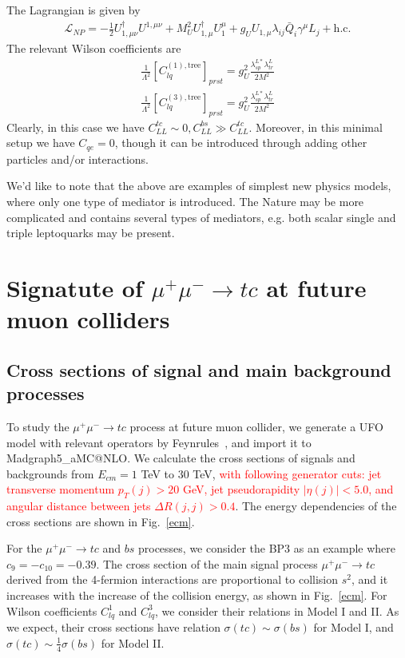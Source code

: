 \documentclass[a4paper,11pt]{article}
\makeatletter
\newcommand{\mgamc}{Madgraph5\_aMC@NLO}
\makeatother
\begin{document}
\begin{enumerate}
        The Lagrangian is given by 
        \begin{align}
        \mathcal{L}_{NP}=-\frac{1}{2}U_{1,\mu\nu}^{\dag}U^{1,\mu\nu}+M_U^2U_{1,\mu}^{\dag}U_1^{\mu}+g_UU_{1,\mu}\lambda_{ij}\bar{Q}_{i}\gamma^{\mu}L_{j}+\textrm{h.c.}
        \end{align}
        The relevant Wilson coefficients are
        \begin{align}
            \frac{1}{\Lambda^2}[C_{lq}^{(1),\textrm{tree}}]_{prst}=g_U^2\frac{\lambda_{sp}^{L*}\lambda_{tr}^{L}}{2M^2}\\
            \frac{1}{\Lambda^2}[C_{lq}^{(3),\textrm{tree}}]_{prst}=g_U^2\frac{\lambda_{sp}^{L*}\lambda_{tr}^{L}}{2M^2}
        \end{align}
        Clearly, in this case we have $C_{LL}^{tc}\sim0,C_{LL}^{bs}\gg C_{LL}^{tc}$. Moreover, in this minimal setup we have $C_{qe}=0$, though it can be introduced through adding other particles and/or interactions.
\end{enumerate}
We'd like to note that the above are examples of simplest new physics models, where only one type of mediator is introduced. The Nature may be more complicated and contains several types of mediators, e.g. both scalar single and triple leptoquarks may be present\cite{Crivellin:2017zlb}.

\section{Signatute of $\mu^+\mu^-\to tc$ at future muon colliders }
\label{Sec:result}

\subsection{Cross sections of signal and main background processes}
To study the $\mu^+\mu^-\to tc$ process at future muon collider, 
we generate a UFO model with relevant operators by Feynrules~\cite{Alloul:2013bka}, 
and import it to \mgamc \cite{Alwall:2014hca}. 
We calculate the cross sections of signals and backgrounds from $E_{cm}=1$ TeV to $30$ TeV, 
\textcolor{red}{with following generator cuts: jet transverse momentum $p_T(j)>20$ GeV, jet pseudorapidity $|\eta(j)|<5.0$, and angular distance between jets $\Delta R(j,j)>0.4$}.
The energy dependencies of the cross sections are shown in Fig.~\ref{ecm}. 

For the $\mu^+\mu^-\to tc$ and $bs$ processes, we consider the BP3 as an example where $c_{9}=-c_{10}=-0.39$. The cross section of the main signal process $\mu^+ \mu^- \to tc$ derived from the 4-fermion interactions are proportional to collision $s^2$, 
and it increases with the increase of the collision energy, as shown in Fig.~\ref{ecm}. 
For Wilson coefficients $C^{1}_{lq}$ and $C^{3}_{lq}$, we consider their relations in Model I and II. 
As we expect, their cross sections have relation $\sigma(tc)\sim \sigma(bs)$ for Model I, and $\sigma(tc)\sim\frac{1}{4}\sigma(bs)$ for Model II. 
\end{document}
